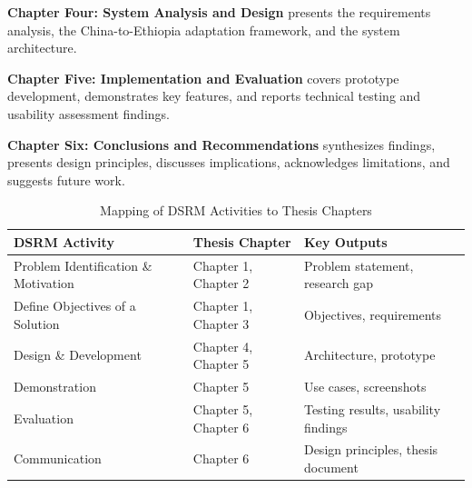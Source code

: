 \textbf{Chapter Four: System Analysis and Design} presents the requirements analysis, the China-to-Ethiopia adaptation framework, and the system architecture.

\textbf{Chapter Five: Implementation and Evaluation} covers prototype development, demonstrates key features, and reports technical testing and usability assessment findings.

\textbf{Chapter Six: Conclusions and Recommendations} synthesizes findings, presents design principles, discusses implications, acknowledges limitations, and suggests future work.

\begin{table}[H]
\centering
\caption{Mapping of DSRM Activities to Thesis Chapters}
\label{tab:dsrm-mapping}
\begin{tabular}{p{4cm}p{3.5cm}p{4.5cm}}
\toprule
\textbf{DSRM Activity} & \textbf{Thesis Chapter} & \textbf{Key Outputs} \\
\midrule
Problem Identification \& Motivation & Chapter 1, Chapter 2 & Problem statement, research gap \\
Define Objectives of a Solution & Chapter 1, Chapter 3 & Objectives, requirements \\
Design \& Development & Chapter 4, Chapter 5 & Architecture, prototype \\
Demonstration & Chapter 5 & Use cases, screenshots \\
Evaluation & Chapter 5, Chapter 6 & Testing results, usability findings \\
Communication & Chapter 6 & Design principles, thesis document \\
\bottomrule
\end{tabular}
\end{table}
